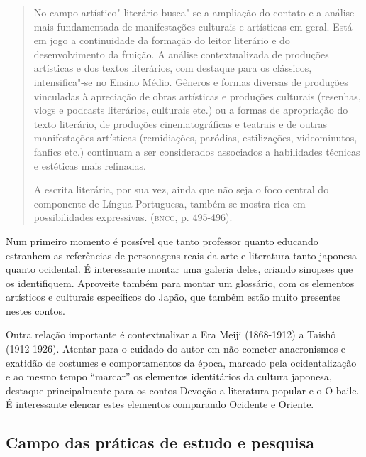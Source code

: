 \documentclass[12pt]{extarticle}
\begin{document}
\begin{quote}
No campo artístico"-literário busca"-se a ampliação do contato e a
análise mais fundamentada de manifestações culturais e artísticas em
geral. Está em jogo a continuidade da formação do leitor literário e do
desenvolvimento da fruição. A análise contextualizada de produções
artísticas e dos textos literários, com destaque para os clássicos,
intensifica"-se no Ensino Médio. Gêneros e formas diversas de produções
vinculadas à apreciação de obras artísticas e produções culturais
(resenhas, vlogs e podcasts literários, culturais etc.) ou a formas de
apropriação do texto literário, de produções cinematográficas e teatrais
e de outras manifestações artísticas (remidiações, paródias,
estilizações, videominutos, fanfics etc.) continuam a ser considerados
associados a habilidades técnicas e estéticas mais refinadas.

A escrita literária, por sua vez, ainda que não seja o foco central do
componente de Língua Portuguesa, também se mostra rica em possibilidades
expressivas. (\textsc{bncc}, p. 495-496).
\end{quote}

Num primeiro momento é possível que tanto professor quanto educando
estranhem as referências de personagens reais da arte e literatura
tanto japonesa quanto ocidental. É interessante montar uma galeria
deles, criando sinopses que os identifiquem. Aproveite também para
montar um glossário, com os elementos artísticos e culturais
específicos do Japão, que também estão muito presentes nestes contos.

Outra relação importante é contextualizar a Era Meiji (1868-1912) a
Taishô (1912-1926). Atentar para o cuidado do autor em não cometer
anacronismos e exatidão de costumes e comportamentos da época, marcado
pela ocidentalização e ao mesmo tempo ``marcar'' os elementos
identitários da cultura japonesa, destaque principalmente para os contos
Devoção a literatura popular e o O baile. É interessante elencar estes
elementos comparando Ocidente e Oriente.

\subsection{Campo das práticas de estudo e pesquisa}
\end{document}
